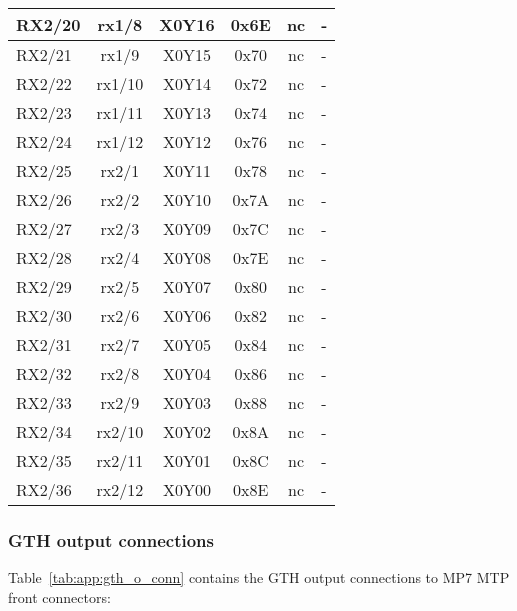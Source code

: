 \begin{longtable}{|l|c|c|c|c|l|}
RX2/20 & rx1/8  & X0Y16 & 0x6E & nc & -\\\hline
RX2/21 & rx1/9  & X0Y15 & 0x70 & nc & -\\\hline
RX2/22 & rx1/10 & X0Y14 & 0x72 & nc & -\\\hline
RX2/23 & rx1/11 & X0Y13 & 0x74 & nc & -\\\hline
RX2/24 & rx1/12 & X0Y12 & 0x76 & nc & -\\\hline
RX2/25 & rx2/1  & X0Y11 & 0x78 & nc & -\\\hline
RX2/26 & rx2/2  & X0Y10 & 0x7A & nc & -\\\hline
RX2/27 & rx2/3  & X0Y09 & 0x7C & nc & -\\\hline
RX2/28 & rx2/4  & X0Y08 & 0x7E & nc & -\\\hline
RX2/29 & rx2/5  & X0Y07 & 0x80 & nc & -\\\hline
RX2/30 & rx2/6  & X0Y06 & 0x82 & nc & -\\\hline
RX2/31 & rx2/7  & X0Y05 & 0x84 & nc & -\\\hline
RX2/32 & rx2/8  & X0Y04 & 0x86 & nc & -\\\hline
RX2/33 & rx2/9  & X0Y03 & 0x88 & nc & -\\\hline
RX2/34 & rx2/10 & X0Y02 & 0x8A & nc & -\\\hline
RX2/35 & rx2/11 & X0Y01 & 0x8C & nc & -\\\hline
RX2/36 & rx2/12 & X0Y00 & 0x8E & nc & -\\\hline
\end{longtable}

\clearpage

\subsubsection{GTH output connections}\label{sec:app:gth_o_conn}

Table~\ref{tab:app:gth_o_conn} contains the GTH output connections to MP7 MTP front connectors:

